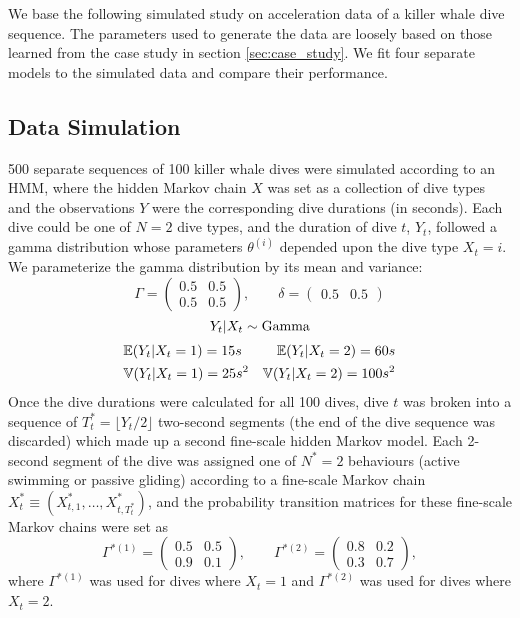 

We base the following simulated study on acceleration data of a killer whale dive sequence. The parameters used to generate the data are loosely based on those learned from the case study in section \ref{sec:case_study}. We fit four separate models to the simulated data and compare their performance.

\subsection{Data Simulation}

500 separate sequences of 100 killer whale dives were simulated according to an HMM, where the hidden Markov chain $X$ was set as a collection of dive types and the observations $Y$ were the corresponding dive durations (in seconds). Each dive could be one of $N=2$ dive types, and the duration of dive $t$, $Y_t$, followed a gamma distribution whose parameters $\theta^{(i)}$ depended upon the dive type $X_t = i$. We parameterize the gamma distribution by its mean and variance:
%
$$\Gamma = \begin{pmatrix} 0.5 & 0.5 \\ 0.5 & 0.5 \end{pmatrix}, \qquad \delta =  \begin{pmatrix} 0.5 & 0.5 \end{pmatrix}$$
$$Y_t|X_t \sim \rm{Gamma} $$
\begin{align*}
	&\mathbb{E}(Y_t|X_t = 1) = 15 s &\mathbb{E}(Y_t|X_t = 2) = 60 s \\
	&\mathbb{V}(Y_t|X_t = 1) = 25 s^2 &\mathbb{V}(Y_t|X_t = 2) = 100 s^2
\end{align*}
%
Once the dive durations were calculated for all 100 dives, dive $t$ was broken into a sequence of $T^*_t = \lfloor Y_t/2 \rfloor$ two-second segments (the end of the dive sequence was discarded) which made up a second fine-scale hidden Markov model. Each 2-second segment of the dive was assigned one of $N^*=2$ behaviours (active swimming or passive gliding) according to a fine-scale Markov chain $X^*_t \equiv \left(X^*_{t,1}, \ldots, X^*_{t,T^*_t} \right)$, and the probability transition matrices for these fine-scale Markov chains were set as
%
$$\Gamma^{*(1)} = \begin{pmatrix} 0.5 & 0.5 \\ 0.9 & 0.1 \end{pmatrix}, \qquad \Gamma^{*(2)} = \begin{pmatrix} 0.8 & 0.2 \\ 0.3 & 0.7 \end{pmatrix},$$ 
%
where $\Gamma^{*(1)}$ was used for dives where $X_t = 1$ and $\Gamma^{*(2)}$ was used for dives where $X_t = 2$. 


